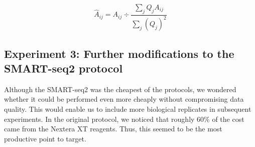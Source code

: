 \begin{equation}
\hat{A}_{ij} = A_{ij} \div \frac{\sum_j Q_j A_{ij}}{\sum_j (Q_j)^2}  
\end{equation}


\subsection{Experiment 3: Further modifications to the SMART-seq2 protocol}

Although the SMART-seq2 was the cheapest of the protocols, we wondered whether it could be performed even more cheaply without compromising data quality.  This would enable us to include more biological replicates in subsequent experiments.  In the original protocol, we noticed that roughly 60\% of the cost came from the Nextera XT reagents.  Thus, this seemed to be the most productive point to target.  

